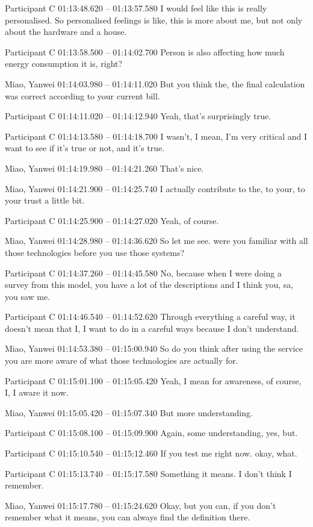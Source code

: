 {Participant C 01:13:48.620 -- 01:13:57.580
I would feel like this is really personalised. So personalised feelings is like, this is more about me, but not only about the hardware and a house.

Participant C 01:13:58.500 -- 01:14:02.700
Person is also affecting how much energy consumption it is, right?

Miao, Yanwei 01:14:03.980 -- 01:14:11.020
But you think the, the final calculation was correct according to your current bill.

Participant C 01:14:11.020 -- 01:14:12.940
Yeah, that's surprisingly true.

Participant C 01:14:13.580 -- 01:14:18.700
I wasn't, I mean, I'm very critical and I want to see if it's true or not, and it's true.

Miao, Yanwei 01:14:19.980 -- 01:14:21.260
That's nice.

Miao, Yanwei 01:14:21.900 -- 01:14:25.740
I actually contribute to the, to your, to your trust a little bit.

Participant C 01:14:25.900 -- 01:14:27.020
Yeah, of course.

Miao, Yanwei 01:14:28.980 -- 01:14:36.620
So let me see. were you familiar with all those technologies before you use those systems?

Participant C 01:14:37.260 -- 01:14:45.580
No, because when I were doing a survey from this model, you have a lot of the descriptions and I think you, sa, you saw me.

Participant C 01:14:46.540 -- 01:14:52.620
Through everything a careful way, it doesn't mean that I, I want to do in a careful ways because I don't understand.

Miao, Yanwei 01:14:53.380 -- 01:15:00.940
So do you think after using the service you are more aware of what those technologies are actually for.

Participant C 01:15:01.100 -- 01:15:05.420
Yeah, I mean for awareness, of course, I, I aware it now.

Miao, Yanwei 01:15:05.420 -- 01:15:07.340
But more understanding.

Participant C 01:15:08.100 -- 01:15:09.900
Again, some understanding, yes, but.

Participant C 01:15:10.540 -- 01:15:12.460
If you test me right now. okay, what.

Participant C 01:15:13.740 -- 01:15:17.580
Something it means. I don't think I remember.

Miao, Yanwei 01:15:17.780 -- 01:15:24.620
Okay, but you can, if you don't remember what it means, you can always find the definition there.

}
